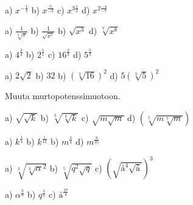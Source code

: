 \begin{tehtava}
a) $x^{-\frac{1}{3}}$ \qquad
b) $x^\frac{5}{-2}$ \qquad
c) $x^{3 \frac{1}{2}}$ \qquad
d) $x^{2 \frac{-4}{-7}}$ \qquad
\begin{vastaus}	
a) $\frac{1}{\sqrt[3]{x}}$ \qquad
b) $\frac{1}{\sqrt{x^5}}$ \qquad
b) $\sqrt{x^3}$ \qquad
d) $\sqrt[7]{x^8}$ 
\end{vastaus}
\end{tehtava}

\begin{tehtava}
a) $4^\frac{3}{4}$ \qquad
b) $2^\frac{5}{1}$ \qquad
c) $16^\frac{2}{3}$ \qquad
d) $5^\frac{5}{3}$ \qquad
\begin{vastaus}	
a) $2\sqrt{2}$ \qquad
b) $32$ \qquad
b) $(\sqrt[3]{16})^2$ \qquad
d) $5(\sqrt[3]{5})^2$ 
\end{vastaus}
\end{tehtava}

Muuta murtopotenssimuotoon.

\begin{tehtava}
a) $\sqrt{\sqrt{k}}$ \qquad
b) $\sqrt[3]{\sqrt[4]{k}}$ \qquad
c) $\sqrt{m\sqrt{m}}$ \qquad
d) $(\sqrt[5]{m\sqrt[7]{m}})$ \qquad
\begin{vastaus}	
a) $k^\frac{1}{4}$ \qquad
b) $k^\frac{1}{12}$ \qquad
b) $m^\frac{3}{4}$ \qquad
d) $m^\frac{8}{35}$ 
\end{vastaus}
\end{tehtava}

\begin{tehtava}
a) $\sqrt[3]{\sqrt[3]{\alpha}^2}$ \qquad
b) $\sqrt[5]{q^2\sqrt{q}}$ \qquad
c) $(\sqrt{å^4\sqrt{å}})^3$ \qquad
\begin{vastaus}	
a) $\alpha^\frac{2}{9}$ \qquad
b) $q^\frac{1}{2}$ \qquad
c) $å^\frac{27}{4}$
\end{vastaus}
\end{tehtava}
